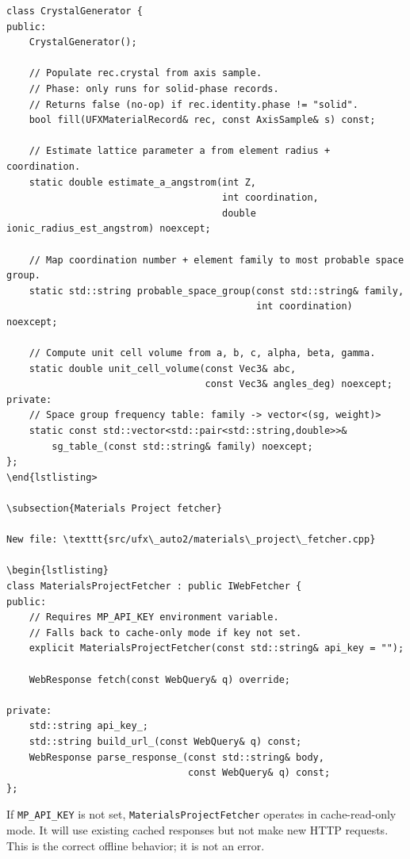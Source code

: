 \documentclass[11pt, a4paper]{article}
\begin{document}
\begin{lstlisting}
class CrystalGenerator {
public:
	CrystalGenerator();

	// Populate rec.crystal from axis sample.
	// Phase: only runs for solid-phase records.
	// Returns false (no-op) if rec.identity.phase != "solid".
	bool fill(UFXMaterialRecord& rec, const AxisSample& s) const;

	// Estimate lattice parameter a from element radius + coordination.
	static double estimate_a_angstrom(int Z,
									  int coordination,
									  double ionic_radius_est_angstrom) noexcept;

	// Map coordination number + element family to most probable space group.
	static std::string probable_space_group(const std::string& family,
											int coordination) noexcept;

	// Compute unit cell volume from a, b, c, alpha, beta, gamma.
	static double unit_cell_volume(const Vec3& abc,
								   const Vec3& angles_deg) noexcept;
private:
	// Space group frequency table: family -> vector<(sg, weight)>
	static const std::vector<std::pair<std::string,double>>&
		sg_table_(const std::string& family) noexcept;
};
\end{lstlisting>

\subsection{Materials Project fetcher}

New file: \texttt{src/ufx\_auto2/materials\_project\_fetcher.cpp}

\begin{lstlisting}
class MaterialsProjectFetcher : public IWebFetcher {
public:
	// Requires MP_API_KEY environment variable.
	// Falls back to cache-only mode if key not set.
	explicit MaterialsProjectFetcher(const std::string& api_key = "");

	WebResponse fetch(const WebQuery& q) override;

private:
	std::string api_key_;
	std::string build_url_(const WebQuery& q) const;
	WebResponse parse_response_(const std::string& body,
								const WebQuery& q) const;
};
\end{lstlisting}

\begin{rulebox}
If \texttt{MP\_API\_KEY} is not set, \texttt{MaterialsProjectFetcher} operates in
cache-read-only mode.  It will use existing cached responses but not make new
HTTP requests.  This is the correct offline behavior; it is not an error.
\end{rulebox}
\end{document}
